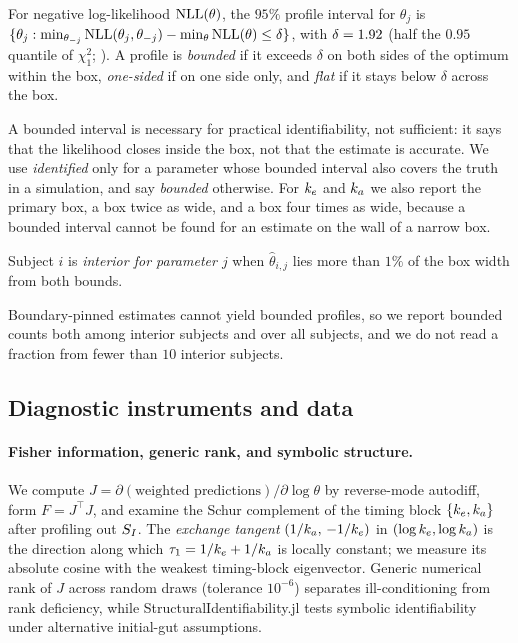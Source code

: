 \begin{definition}
\label{def:profile}
For negative log-likelihood $\mathrm{NLL}(\theta)$, the $95\%$ profile interval for $\theta_j$ is $\{\theta_j : \min_{\theta_{-j}}\mathrm{NLL}(\theta_j,\theta_{-j})-\min_\theta \mathrm{NLL}(\theta) \le \delta\}$, with $\delta=1.92$ (half the $0.95$ quantile of $\chi^2_1$; \citealp{venzon1988method}).
A profile is \emph{bounded} if it exceeds $\delta$ on both sides of the optimum within the box, \emph{one-sided} if on one side only, and \emph{flat} if it stays below $\delta$ across the box.
\end{definition}

A bounded interval is necessary for practical identifiability, not sufficient: it says that the likelihood closes inside the box, not that the estimate is accurate. We use \emph{identified} only for a parameter whose bounded interval also covers the truth in a simulation, and say \emph{bounded} otherwise.
For $k_e$ and $k_a$ we also report the primary box, a box twice as wide, and a box four times as wide, because a bounded interval cannot be found for an estimate on the wall of a narrow box.

\begin{definition}
\label{def:interior}
Subject $i$ is \emph{interior for parameter $j$} when $\hat\theta_{i,j}$ lies more than $1\%$ of the box width from both bounds.
\end{definition}

Boundary-pinned estimates cannot yield bounded profiles, so we report bounded counts both among interior subjects and over all subjects, and we do not read a fraction from fewer than $10$ interior subjects.

\subsection{Diagnostic instruments and data}
\label{sec:instruments}

\paragraph{Fisher information, generic rank, and symbolic structure.}
We compute $J=\partial(\text{weighted predictions})/\partial\log\theta$ by reverse-mode autodiff, form $F=J^\top J$, and examine the Schur complement of the timing block $\{k_e,k_a\}$ after profiling out $S_I$.
The \emph{exchange tangent} $(1/k_a,\,-1/k_e)$ in $(\log k_e,\log k_a)$ is the direction along which $\tau_1=1/k_e+1/k_a$ is locally constant; we measure its absolute cosine with the weakest timing-block eigenvector.
Generic numerical rank of $J$ across random draws (tolerance $10^{-6}$) separates ill-conditioning from rank deficiency, while StructuralIdentifiability.jl \citep{dong2023differential} tests symbolic identifiability under alternative initial-gut assumptions.

